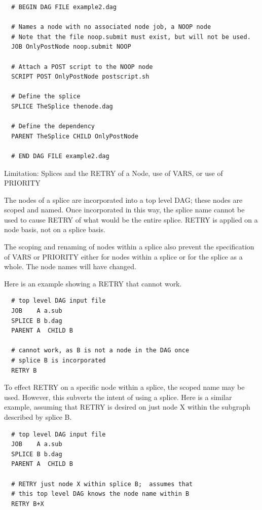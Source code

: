 \footnotesize
\begin{verbatim}
  # BEGIN DAG FILE example2.dag

  # Names a node with no associated node job, a NOOP node
  # Note that the file noop.submit must exist, but will not be used.
  JOB OnlyPostNode noop.submit NOOP

  # Attach a POST script to the NOOP node
  SCRIPT POST OnlyPostNode postscript.sh

  # Define the splice
  SPLICE TheSplice thenode.dag
 
  # Define the dependency
  PARENT TheSplice CHILD OnlyPostNode

  # END DAG FILE example2.dag
\end{verbatim}
\normalsize

\begin{description}
\item[Limitation: Splices and the RETRY of a Node, use of VARS, or use of PRIORITY]
\end{description}

The nodes of a splice are incorporated into a top level DAG;
these nodes are scoped and named.
Once incorporated in this way, the splice name cannot be used
to cause RETRY of what would be the entire splice.
RETRY is applied on a node basis, not on a splice basis.

The scoping and renaming of nodes within a splice also prevent
the specification of VARS or PRIORITY either for nodes within a splice
or for the splice as a whole.
The node names will have changed.

Here is an example showing a RETRY that cannot work.
\begin{verbatim}
  # top level DAG input file
  JOB    A a.sub
  SPLICE B b.dag
  PARENT A  CHILD B

  # cannot work, as B is not a node in the DAG once
  # splice B is incorporated
  RETRY B
\end{verbatim}

To effect RETRY on a specific node within a splice,
the scoped name may be used.
However, this subverts the intent of using a splice.
Here is a similar example, assuming that RETRY is desired
on just node X within the subgraph described by splice B.
\begin{verbatim}
  # top level DAG input file
  JOB    A a.sub
  SPLICE B b.dag
  PARENT A  CHILD B

  # RETRY just node X within splice B;  assumes that
  # this top level DAG knows the node name within B
  RETRY B+X
\end{verbatim}

